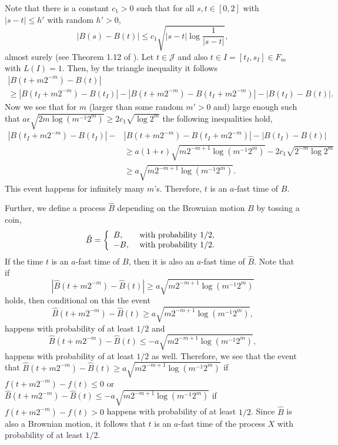 \documentclass[11pt, reqno]{amsart}
\theoremstyle{plain}
\theoremstyle{definition}
\theoremstyle{remark}
\begin{document}
Note that there is a constant $c_1>0$ such that for all $s,t\in{[0,2]}$ with $|s-t|\leq h'$ with random $h'>0$,
$$ |B(s)-B(t)| \leq c_1\sqrt{|s-t|\log{\frac{1}{|s-t|}}},$$
almost surely (see Theorem 1.12 of \cite{MP}). 
Let $t\in {\mathcal{J}}$ and also $t\in I =[t_I,s_I] \in F_m$ with $L(I)=1$. Then, by the triangle inequality it follows
\begin{multline*}
|{B}(t + m2^{-m})-{B}(t)| \\ \geq |{B}(t_I+m2^{-m}) - {B}(t_I)| -|{B}(t + m2^{-m})-{B}(t_I+m2^{-m})| -|{B}(t_I)-{B}(t)|.
\end{multline*}
Now we see that for $m$ (larger than some random $m'>0$ and) large enough such that $a\epsilon\sqrt{2m\log(m^{-1}2^m)} \geq 2c_1\sqrt{\log{2^{m}}}$ the following inequalities hold, 
\begin{align*}
 |{B}(t_I+m2^{-m}) - {B}(t_I)| -& |{B}(t + m2^{-m})-{B}(t_I+m2^{-m})| -|{B}(t_I)-{B}(t)| \\ &\geq a(1+\epsilon)\sqrt{m2^{-m+1}\log(m^{-1}2^m)} - 2c_1\sqrt{2^{-m}\log{2^{m}}} \\ &\geq a\sqrt{m2^{-m+1}\log(m^{-1}2^m)}.
\end{align*}
This event happens for infinitely many $m$'s. 
Therefore, $t$ is an $a$-fast time of $B$.

Further, we define a process $\hat{B}$ depending on the Brownian motion $B$ by tossing a coin,
$$ \hat{B} =\left\{\begin{array}{l l} B,& \text{ with probability } 1/2, \\ -B,& \text{ with probability } 1/2 . \end{array}\right.$$ 
If the time $t$ is an $a$-fast time of $B$, then it is also an $a$-fast time of $\hat{B}$.  
Note that if $$|\hat{B}(t + m2^{-m})-\hat{B}(t)| \geq a\sqrt{m2^{-m+1}\log(m^{-1}2^m)}$$ holds, then conditional on this the event $$\hat{B}(t + m2^{-m})-\hat{B}(t) \geq a\sqrt{m2^{-m+1}\log(m^{-1}2^m)},$$ happens with probability of at least $1/2$ and
$$\hat{B}(t + m2^{-m})-\hat{B}(t) \leq -a\sqrt{m2^{-m+1}\log(m^{-1}2^m)},$$ happens with probability of at least $1/2$ as well. Therefore, we see that the event that $\hat{B}(t + m2^{-m})-\hat{B}(t) \geq a\sqrt{m2^{-m+1}\log(m^{-1}2^m)}$ if $f(t + m2^{-m})-f(t) \leq 0$ or $\hat{B}(t + m2^{-m})-\hat{B}(t) \leq -a\sqrt{m2^{-m+1}\log(m^{-1}2^m)}$ if $f(t + m2^{-m})-f(t) > 0$ happens
 with probability of at least $1/2$. Since $\hat{B}$ is also a Brownian motion, it follows that $t$ is an $a$-fast time of the process $X$ with probability of at least $1/2$.
\end{document}
